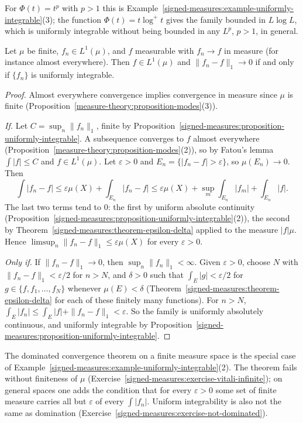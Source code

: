 For $\Phi(t) = t^p$ with $p > 1$ this is Example~\ref{signed-measures:example-uniformly-integrable}(3); the function $\Phi(t) = t\log^+t$ gives the family bounded in $L\log L$, which is uniformly
integrable without being bounded in any $L^p$, $p > 1$, in general.

\begin{theorem}\label{signed-measures:theorem-vitali-convergence}
Let $\mu$ be finite, $f_n \in L^1(\mu)$, and $f$ measurable with $f_n \to f$ in measure (for instance almost everywhere). Then $f \in L^1(\mu)$ and $\|f_n - f\|_1 \to 0$ if and only if
$\{f_n\}$ is uniformly integrable.
\end{theorem}

\begin{proof}
Almost everywhere convergence implies convergence in measure since $\mu$ is finite (Proposition~\ref{measure-theory:proposition-modes}(3)).

\emph{If.} Let $C = \sup_n\|f_n\|_1$, finite by Proposition~\ref{signed-measures:proposition-uniformly-integrable}. A subsequence converges to $f$ almost everywhere
(Proposition~\ref{measure-theory:proposition-modes}(2)), so by Fatou's lemma $\int|f| \leq C$ and $f \in L^1(\mu)$. Let $\varepsilon > 0$ and $E_n = \{|f_n - f| > \varepsilon\}$, so
$\mu(E_n) \to 0$. Then
\[
\int|f_n - f| \leq \varepsilon\mu(X) + \int_{E_n}|f_n - f| \leq \varepsilon\mu(X) + \sup_m\int_{E_n}|f_m| + \int_{E_n}|f| .
\]
The last two terms tend to $0$: the first by uniform absolute continuity (Proposition~\ref{signed-measures:proposition-uniformly-integrable}(2)), the second by
Theorem~\ref{signed-measures:theorem-epsilon-delta} applied to the measure $|f|\mu$. Hence $\limsup_n\|f_n - f\|_1 \leq \varepsilon\mu(X)$ for every $\varepsilon > 0$.

\emph{Only if.} If $\|f_n - f\|_1 \to 0$, then $\sup_n\|f_n\|_1 < \infty$. Given $\varepsilon > 0$, choose $N$ with $\|f_n - f\|_1 < \varepsilon/2$ for $n > N$, and $\delta > 0$ such that
$\int_E|g| < \varepsilon/2$ for $g \in \{f, f_1, \ldots, f_N\}$ whenever $\mu(E) < \delta$ (Theorem~\ref{signed-measures:theorem-epsilon-delta} for each of these finitely many functions). For
$n > N$, $\int_E|f_n| \leq \int_E|f| + \|f_n - f\|_1 < \varepsilon$. So the family is uniformly absolutely continuous, and uniformly integrable by
Proposition~\ref{signed-measures:proposition-uniformly-integrable}.
\end{proof}

The dominated convergence theorem on a finite measure space is the special case of Example~\ref{signed-measures:example-uniformly-integrable}(2). The theorem fails without finiteness of $\mu$
(Exercise~\ref{signed-measures:exercise-vitali-infinite}); on general spaces one adds the condition that for every $\varepsilon > 0$ some set of finite measure carries all but $\varepsilon$ of every $\int|f_n|$.
Uniform integrability is also not the same as domination (Exercise~\ref{signed-measures:exercise-not-dominated}).

